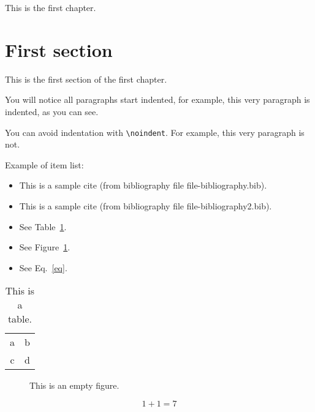 
This is the first chapter.

\section{First section}

This is the first section of the first chapter. 

You will notice all paragraphs start indented, for example, this very paragraph is indented, as you can see.

\noindent You can avoid indentation with \verb#\noindent#. For example, this very paragraph is not.

\noindent Example of item list:

\begin{itemize}
 \item This is a sample cite\cite{yo:07} (from bibliography file file-bibliography.bib).
 \item This is a sample cite\cite{yo:08} (from bibliography file file-bibliography2.bib).
 \item See Table~\ref{tab}.
 \item See Figure~\ref{fig}.
 \item See Eq.~\ref{eq}.
\end{itemize}

\begin{table}[hbt]
 \begin{center}
 \begin{tabular}{cc}
  a & b \\
  c & d 
 \end{tabular}
 \end{center}
 \caption{This is a table.}
 \label{tab}
\end{table}

\begin{figure}[hbt]
 \begin{center}
 \end{center}
 \caption{This is an empty figure.}
 \label{fig}
\end{figure}

\begin{equation}
  1 + 1 = 7
 \label{eq}
\end{equation}
